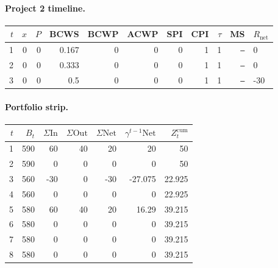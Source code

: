 \documentclass[12pt, a4paper]{article}
\begin{document}
\paragraph{Project 2 timeline.}
\begin{center}
\begin{tabular}{rrrrrrrrrrl}
\toprule
$t$ & $x$ & $P$ & BCWS & BCWP & ACWP & SPI & CPI & $\tau$ & MS & $R_{\mathrm{net}}$\\
\midrule
1 & 0 & 0 & 0.167 & 0 & 0 & 0 & 1 & 1 & \texttt{---} & 0 \\
2 & 0 & 0 & 0.333 & 0 & 0 & 0 & 1 & 1 & \texttt{---} & 0 \\
3 & 0 & 0 & 0.5 & 0 & 0 & 0 & 1 & 1 & \texttt{---} & -30 \\
\bottomrule
\end{tabular}
\end{center}
\paragraph{Portfolio strip.}
\begin{center}
\begin{tabular}{rrrrrrr}
\toprule
$t$ & $B_t$ & $\Sigma\mathrm{In}$ & $\Sigma\mathrm{Out}$ & $\Sigma\mathrm{Net}$ & $\gamma^{t-1}\mathrm{Net}$ & $Z_t^{\mathrm{cum}}$\\
\midrule
1 & 590 & 60 & 40 & 20 & 20 & 50 \\
2 & 590 & 0 & 0 & 0 & 0 & 50 \\
3 & 560 & -30 & 0 & -30 & -27.075 & 22.925 \\
4 & 560 & 0 & 0 & 0 & 0 & 22.925 \\
5 & 580 & 60 & 40 & 20 & 16.29 & 39.215 \\
6 & 580 & 0 & 0 & 0 & 0 & 39.215 \\
7 & 580 & 0 & 0 & 0 & 0 & 39.215 \\
8 & 580 & 0 & 0 & 0 & 0 & 39.215 \\
\bottomrule
\end{tabular}
\end{center}
\end{document}
